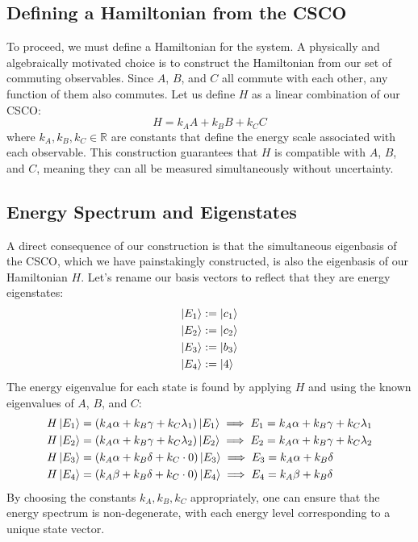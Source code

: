 \documentclass[11pt,a4paper]{article}
\begin{document}
\subsection{Defining a Hamiltonian from the CSCO}

To proceed, we must define a Hamiltonian for the system. A physically and
algebraically motivated choice is to construct the Hamiltonian from our set of
commuting observables. Since $A$, $B$, and $C$ all commute with each other, any
function of them also commutes. Let us define $H$ as a linear combination of our
CSCO:
$$
H = k_A A + k_B B + k_C C
$$
where $k_A, k_B, k_C \in \mathbb{R}$ are constants that define the energy scale
associated with each observable. This construction guarantees that $H$ is
compatible with $A$, $B$, and $C$, meaning they can all be measured
simultaneously without uncertainty.

\subsection{Energy Spectrum and Eigenstates}

A direct consequence of our construction is that the simultaneous eigenbasis of
the CSCO, which we have painstakingly constructed, is also the eigenbasis of our
Hamiltonian $H$. Let's rename our basis vectors to reflect that they are energy
eigenstates:
\begin{align*}
  \ket{E_1} &:= \ket{c_1} \\
  \ket{E_2} &:= \ket{c_2} \\
  \ket{E_3} &:= \ket{b_3} \\
  \ket{E_4} &:= \ket{4}
\end{align*}
The energy eigenvalue for each state is found by applying $H$ and using the
known eigenvalues of $A$, $B$, and $C$:
\begin{align*}
  H\ket{E_1} &= (k_A\alpha + k_B\gamma + k_C\lambda_1)\ket{E_1} \implies E_1 = k_A\alpha + k_B\gamma + k_C\lambda_1 \\
  H\ket{E_2} &= (k_A\alpha + k_B\gamma + k_C\lambda_2)\ket{E_2} \implies E_2 = k_A\alpha + k_B\gamma + k_C\lambda_2 \\
  H\ket{E_3} &= (k_A\alpha + k_B\delta + k_C \cdot 0)\ket{E_3} \implies E_3 = k_A\alpha + k_B\delta \\
  H\ket{E_4} &= (k_A\beta + k_B\delta + k_C \cdot 0)\ket{E_4} \implies E_4 = k_A\beta + k_B\delta
\end{align*}
By choosing the constants $k_A, k_B, k_C$ appropriately, one can ensure that the
energy spectrum is non-degenerate, with each energy level corresponding to a
unique state vector.
\end{document}
